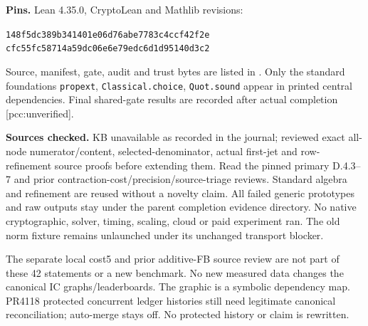 \documentclass[10pt]{article}
\begin{document}
\textbf{Pins.} Lean 4.35.0, CryptoLean and Mathlib revisions:
\begin{center}\small
\texttt{148f5dc389b341401e06d76abe7783c4ccf42f2e}\\
\texttt{cfc55fc58714a59dc06e6e79edc6d1d95140d3c2}
\end{center}
Source, manifest, gate, audit and trust bytes are listed in
. Only the standard foundations
\texttt{propext}, \texttt{Classical.choice}, \texttt{Quot.sound} appear in
printed central dependencies. Final shared-gate results are recorded after
actual completion [pcc:unverified].

\textbf{Sources checked.} KB unavailable as recorded in the journal;
reviewed exact all-node numerator/content, selected-denominator, actual
first-jet and row-refinement source proofs before extending them. Read the
pinned primary D.4.3--7 and prior contraction-cost/precision/source-triage
reviews. Standard algebra and refinement are reused without a novelty claim.
All failed generic prototypes and raw outputs stay under the parent completion
evidence directory. No native cryptographic, solver, timing, scaling, cloud
or paid experiment ran. The old norm fixture remains unlaunched under its
unchanged transport blocker.

The separate local cost5 and prior additive-FB source review are not part of
these 42 statements or a new benchmark. No new measured data changes the
canonical IC graphs/leaderboards. The graphic is a symbolic dependency map.
PR4118 protected concurrent ledger histories still need legitimate canonical
reconciliation; auto-merge stays off. No protected history or claim is rewritten.
\end{document}
